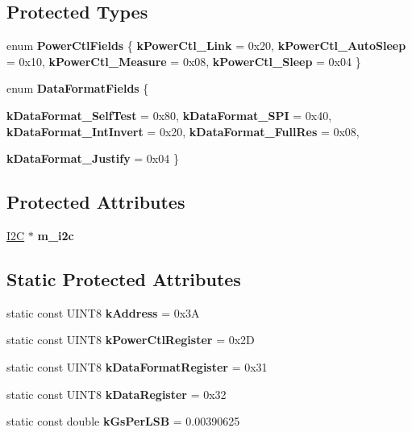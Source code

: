 \subsection*{Protected Types}
\begin{DoxyCompactItemize}
\item 
enum {\bfseries PowerCtlFields} \{ {\bfseries kPowerCtl\_\-Link} = 0x20, 
{\bfseries kPowerCtl\_\-AutoSleep} = 0x10, 
{\bfseries kPowerCtl\_\-Measure} = 0x08, 
{\bfseries kPowerCtl\_\-Sleep} = 0x04
 \}
\item 
enum {\bfseries DataFormatFields} \{ \par
{\bfseries kDataFormat\_\-SelfTest} = 0x80, 
{\bfseries kDataFormat\_\-SPI} = 0x40, 
{\bfseries kDataFormat\_\-IntInvert} = 0x20, 
{\bfseries kDataFormat\_\-FullRes} = 0x08, 
\par
{\bfseries kDataFormat\_\-Justify} = 0x04
 \}
\end{DoxyCompactItemize}
\subsection*{Protected Attributes}
\begin{DoxyCompactItemize}
\item 
\hypertarget{classADXL345__I2C_a714765b5abc21ebffed4c28c18017f6a}{
\hyperlink{classI2C}{I2C} $\ast$ {\bfseries m\_\-i2c}}
\label{classADXL345__I2C_a714765b5abc21ebffed4c28c18017f6a}

\end{DoxyCompactItemize}
\subsection*{Static Protected Attributes}
\begin{DoxyCompactItemize}
\item 
\hypertarget{classADXL345__I2C_a20a25b8eb9b276134dcc20e81bcd340b}{
static const UINT8 {\bfseries kAddress} = 0x3A}
\label{classADXL345__I2C_a20a25b8eb9b276134dcc20e81bcd340b}

\item 
\hypertarget{classADXL345__I2C_a2dce6a94c87536354d77580a077c3778}{
static const UINT8 {\bfseries kPowerCtlRegister} = 0x2D}
\label{classADXL345__I2C_a2dce6a94c87536354d77580a077c3778}

\item 
\hypertarget{classADXL345__I2C_a76a0e0b8c1e410712304de8ab43929fa}{
static const UINT8 {\bfseries kDataFormatRegister} = 0x31}
\label{classADXL345__I2C_a76a0e0b8c1e410712304de8ab43929fa}

\item 
\hypertarget{classADXL345__I2C_a7d46af99a08cd5c900db158b0ea83141}{
static const UINT8 {\bfseries kDataRegister} = 0x32}
\label{classADXL345__I2C_a7d46af99a08cd5c900db158b0ea83141}

\item 
\hypertarget{classADXL345__I2C_a01a8e14f6879111accaf89c922a29c96}{
static const double {\bfseries kGsPerLSB} = 0.00390625}
\label{classADXL345__I2C_a01a8e14f6879111accaf89c922a29c96}

\end{DoxyCompactItemize}


